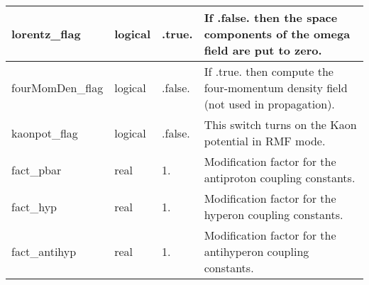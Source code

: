 \documentclass{article}
\begin{document}
\begin{longtable}{llll}
\midrule
lorentz\_flag & \begin{minipage}[t]{2cm}logical\end{minipage} & \begin{minipage}[t]{2cm}.true.\end{minipage} & \begin{minipage}[t]{12cm}If .false. then the space components of the omega field are put to zero.\end{minipage}\\*
\midrule
fourMomDen\_flag & \begin{minipage}[t]{2cm}logical\end{minipage} & \begin{minipage}[t]{2cm}.false.\end{minipage} & \begin{minipage}[t]{12cm}If .true. then compute the four-momentum density field (not used in propagation).\end{minipage}\\*
\midrule
kaonpot\_flag & \begin{minipage}[t]{2cm}logical\end{minipage} & \begin{minipage}[t]{2cm}.false.\end{minipage} & \begin{minipage}[t]{12cm}This switch turns on the Kaon potential in RMF mode.\end{minipage}\\*
\midrule
fact\_pbar & \begin{minipage}[t]{2cm}real\end{minipage} & \begin{minipage}[t]{2cm}1.\end{minipage} & \begin{minipage}[t]{12cm}Modification factor for the antiproton coupling constants.\end{minipage}\\*
\midrule
fact\_hyp & \begin{minipage}[t]{2cm}real\end{minipage} & \begin{minipage}[t]{2cm}1.\end{minipage} & \begin{minipage}[t]{12cm}Modification factor for the hyperon coupling constants.\end{minipage}\\*
\midrule
fact\_antihyp & \begin{minipage}[t]{2cm}real\end{minipage} & \begin{minipage}[t]{2cm}1.\end{minipage} & \begin{minipage}[t]{12cm}Modification factor for the antihyperon coupling constants.\end{minipage}\\*

\end{longtable}
\end{document}
